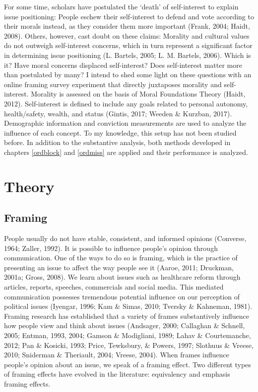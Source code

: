 \documentclass[12pt,econ]{sources/authesis}
\begin{document}
For some time, scholars have postulated the `death' of self-interest to explain issue positioning: People eschew their self-interest to defend and vote according to their morals instead, as they consider them more important (Frank, 2004; Haidt, 2008). Others, however, cast doubt on these claims: Morality and cultural values do not outweigh self-interest concerns, which in turn represent a significant factor in determining issue positioning (L. Bartels, 2005; L. M. Bartels, 2006). Which is it? Have moral concerns displaced self-interest? Does self-interest matter more than postulated by many? I intend to shed some light on these questions with an online framing survey experiment that directly juxtaposes morality and self-interest. Morality is assessed on the basis of Moral Foundations Theory (Haidt, 2012). Self-interest is defined to include any goals related to personal autonomy, health/safety, wealth, and status (Gintis, 2017; Weeden \& Kurzban, 2017). Demographic information and conviction measurements are used to analyze the influence of each concept. To my knowledge, this setup has not been studied before. In addition to the substantive analysis, both methods developed in chapters \ref{ordblock} and \ref{ordmiss} are applied and their performance is analyzed.

\hypertarget{framing-theory}{%
\section{Theory}\label{framing-theory}}

\hypertarget{framing-theory-framing}{%
\subsection{Framing}\label{framing-theory-framing}}

People usually do not have stable, consistent, and informed opinions (Converse, 1964; Zaller, 1992). It is possible to influence people's opinion through communication. One of the ways to do so is framing, which is the practice of presenting an issue to affect the way people see it (Aaroe, 2011; Druckman, 2001a; Gross, 2008). We learn about issues such as healthcare reform through articles, reports, speeches, commercials and social media. This mediated communication possesses tremendous potential influence on our perception of political issues (Iyengar, 1996; Kam \& Simas, 2010; Tversky \& Kahneman, 1981). Framing research has established that a variety of frames substantively influence how people view and think about issues (Andsager, 2000; Callaghan \& Schnell, 2005; Entman, 1993, 2004; Gamson \& Modigliani, 1989; Lahav \& Courtemanche, 2012; Pan \& Kosicki, 1993; Price, Tewksbury, \& Powers, 1997; Slothuus \& Vreese, 2010; Sniderman \& Theriault, 2004; Vreese, 2004). When frames influence people's opinion about an issue, we speak of a framing effect. Two different types of framing effects have evolved in the literature: equivalency and emphasis framing effects.
\end{document}
